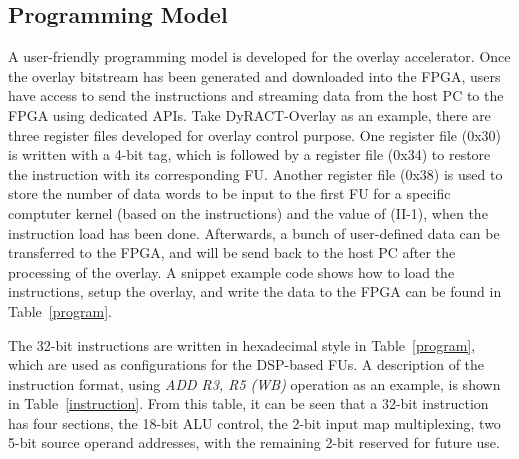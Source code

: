 \subsection{Programming Model}
A user-friendly programming model is developed for the overlay accelerator. 
Once the overlay bitstream has been generated and downloaded into the FPGA, users have access to send the instructions and streaming data from the host PC to the FPGA using dedicated APIs. 
Take DyRACT-Overlay as an example, there are three register files developed for overlay control purpose. 
One register file (0x30) is written with a 4-bit tag, which is followed by a register file (0x34) to restore the instruction with its corresponding FU. 
Another register file (0x38) is used to store the number of data words to be input to the first FU for a specific comptuter kernel (based on the instructions) and the value of (II-1), when the instruction load has been done. 
Afterwards, a bunch of user-defined data can be transferred to the FPGA, and will be send back to the host PC after the processing of the overlay. 
A snippet example code shows how to load the instructions, setup the overlay, and write the data to the FPGA can be found in Table~\ref{program}. 



The 32-bit instructions are written in hexadecimal style in Table~\ref{program}, which are used as configurations for the DSP-based FUs. 
A description of the instruction format, using \textit{ADD R3, R5 (WB)} operation as an example, is shown in Table~\ref{instruction}. 
From this table, it can be seen that a 32-bit instruction has four sections, the 18-bit ALU control, the 2-bit input map multiplexing, two 5-bit source operand addresses, with the remaining 2-bit reserved for future use. 



